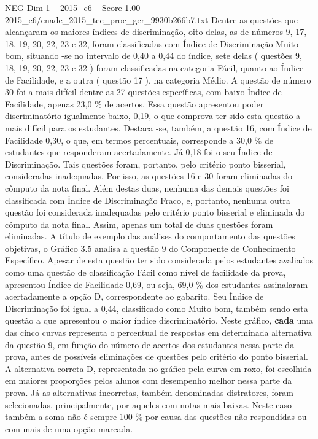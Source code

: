 \begin{textsample}{NEG Dim 1 – 2015\_c6 – Score 1.00 – 2015\_c6/enade\_2015\_tec\_proc\_ger\_9930b266b7.txt}
Dentre as questões que alcançaram os maiores índices de discriminação, oito delas, as de números 9, 17, 18, 19, 20, 22, 23 e 32, foram classificadas com Índice de Discriminação Muito bom, situando -se no intervalo de 0,40 a 0,44 do índice, sete delas ( questões 9, 18, 19, 20, 22, 23 e 32 ) foram classificadas na categoria Fácil, quanto ao Índice de Facilidade, e a outra ( questão 17 ), na categoria Médio.
A questão de número 30 foi a mais difícil dentre as 27 questões específicas, com baixo Índice de Facilidade, apenas 23,0 \% de acertos.
Essa questão apresentou poder discriminatório igualmente baixo, 0,19, o que comprova ter sido esta questão a mais difícil para os estudantes.
Destaca -se, também, a questão 16, com Índice de Facilidade 0,30, o que, em termos percentuais, corresponde a 30,0 \% de estudantes que responderam acertadamente.
Já 0,18 foi o seu Índice de Discriminação.
Tais questões foram, portanto, pelo critério ponto bisserial, consideradas inadequadas.
Por isso, as questões 16 e 30 foram eliminadas do cômputo da nota final.
Além destas duas, nenhuma das demais questões foi classificada com Índice de Discriminação Fraco, e, portanto, nenhuma outra questão foi considerada inadequadas pelo critério ponto bisserial e eliminada do cômputo da nota final.
Assim, apenas um total de duas questões foram eliminadas.
A título de exemplo das análises do comportamento das questões objetivas, o Gráfico 3.5 analisa a questão 9 do Componente de Conhecimento Específico.
Apesar de esta questão ter sido considerada pelos estudantes avaliados como uma questão de classificação Fácil como nível de facilidade da prova, apresentou Índice de Facilidade 0,69, ou seja, 69,0 \% dos estudantes assinalaram acertadamente a opção D, correspondente ao gabarito.
Seu Índice de Discriminação foi igual a 0,44, classificado como Muito bom, também sendo esta questão a que apresentou o maior índice discriminatório.
Neste gráfico, \textbf{cada} uma das cinco curvas representa o percentual de respostas em determinada alternativa da questão 9, em função do número de acertos dos estudantes nessa parte da prova, antes de possíveis eliminações de questões pelo critério do ponto bisserial.
A alternativa correta D, representada no gráfico pela curva em roxo, foi escolhida em maiores proporções pelos alunos com desempenho melhor nessa parte da prova.
Já as alternativas incorretas, também denominadas distratores, foram selecionadas, principalmente, por aqueles com notas mais baixas.
Neste caso também a soma não é sempre 100 \% por causa das questões não respondidas ou com mais de uma opção marcada.

\end{textsample}
